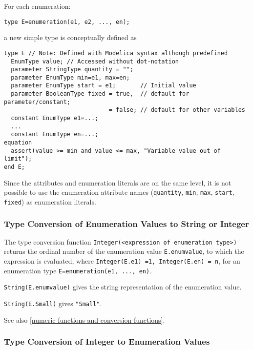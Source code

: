 For each enumeration:
\begin{lstlisting}[language=modelica]
type E=enumeration(e1, e2, ..., en);
\end{lstlisting}

a new simple type is conceptually defined as

\begin{lstlisting}[language=modelica]
type E // Note: Defined with Modelica syntax although predefined
  EnumType value; // Accessed without dot-notation
  parameter StringType quantity = "";
  parameter EnumType min=e1, max=en;
  parameter EnumType start = e1;       // Initial value
  parameter BooleanType fixed = true,  // default for parameter/constant;
                              = false; // default for other variables
  constant EnumType e1=...;
  ...
  constant EnumType en=...;
equation
  assert(value >= min and value <= max, "Variable value out of limit");
end E;
\end{lstlisting}

\begin{nonnormative}
Since the attributes and enumeration literals are on the same
level, it is not possible to use the enumeration attribute names
(\lstinline!quantity!, \lstinline!min!, \lstinline!max!, \lstinline!start!, \lstinline!fixed!) as enumeration literals.
\end{nonnormative}

\subsubsection{Type Conversion of Enumeration Values to String or Integer}

The type conversion function \lstinline!Integer(<expression of enumeration type>)! returns the ordinal number of the
enumeration value \lstinline!E.enumvalue!, to which the expression is evaluated,
where \lstinline!Integer(E.e1) =1, Integer(E.en) = n!, for an enumeration type
\lstinline!E=enumeration(e1, ..., en)!.

\lstinline!String(E.enumvalue)! gives the string representation of the enumeration
value.

\begin{example}
\lstinline!String(E.Small)! gives \lstinline!"Small"!.
\end{example}

See also \autoref{numeric-functions-and-conversion-functions}.

\subsubsection{Type Conversion of Integer to Enumeration Values}

